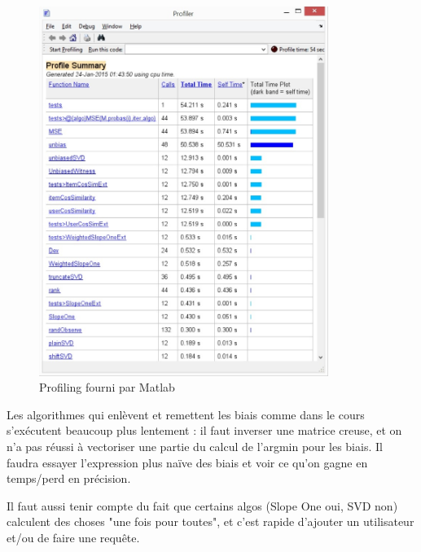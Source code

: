 		\begin{figure}[ht!]
			\centering
			\includegraphics[height=120mm]{times.jpg}
			\caption{Profiling fourni par Matlab}
		\end{figure}
		

		Les algorithmes qui enlèvent et remettent les biais comme dans le cours s'exécutent beaucoup plus lentement : il faut inverser une matrice creuse, et on n'a pas réussi à vectoriser une partie du calcul de l'argmin pour les biais. Il faudra essayer l'expression plus naïve des biais et voir ce qu'on gagne en temps/perd en précision.
		
		Il faut aussi tenir compte du fait que certains algos (Slope One oui, SVD non) calculent des choses "une fois pour toutes", et c'est rapide d'ajouter un utilisateur et/ou de faire une requête.
		



